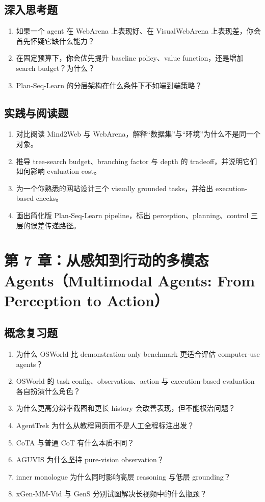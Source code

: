 \subsection*{深入思考题}
\begin{enumerate}
\item 如果一个 agent 在 WebArena 上表现好、在 VisualWebArena 上表现差，你会首先怀疑它缺什么能力？
\item 在固定预算下，你会优先提升 baseline policy、value function，还是增加 search budget？为什么？
\item Plan-Seq-Learn 的分层架构在什么条件下不如端到端策略？
\end{enumerate}

\subsection*{实践与阅读题}
\begin{enumerate}
\item 对比阅读 Mind2Web 与 WebArena，解释“数据集”与“环境”为什么不是同一个对象。
\item 推导 tree-search budget、branching factor 与 depth 的 tradeoff，并说明它们如何影响 evaluation cost。
\item 为一个你熟悉的网站设计三个 visually grounded tasks，并给出 execution-based checks。
\item 画出简化版 Plan-Seq-Learn pipeline，标出 perception、planning、control 三层的误差传递路径。
\end{enumerate}

\section{第 7 章：从感知到行动的多模态 Agents（Multimodal Agents: From Perception to Action）}

\subsection*{概念复习题}
\begin{enumerate}
\item 为什么 OSWorld 比 demonstration-only benchmark 更适合评估 computer-use agents？
\item OSWorld 的 task config、observation、action 与 execution-based evaluation 各自扮演什么角色？
\item 为什么更高分辨率截图和更长 history 会改善表现，但不能根治问题？
\item AgentTrek 为什么从教程网页而不是人工全程标注出发？
\item CoTA 与普通 CoT 有什么本质不同？
\item AGUVIS 为什么坚持 pure-vision observation？
\item inner monologue 为什么同时影响高层 reasoning 与低层 grounding？
\item xGen-MM-Vid 与 GenS 分别试图解决长视频中的什么瓶颈？
\end{enumerate}

